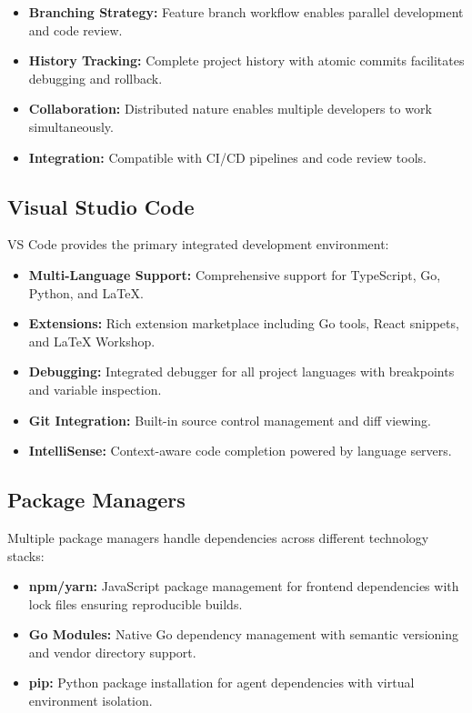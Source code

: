 \begin{itemize}
    \item \textbf{Branching Strategy:} Feature branch workflow enables parallel development and code review.
    \item \textbf{History Tracking:} Complete project history with atomic commits facilitates debugging and rollback.
    \item \textbf{Collaboration:} Distributed nature enables multiple developers to work simultaneously.
    \item \textbf{Integration:} Compatible with CI/CD pipelines and code review tools.
\end{itemize}

\subsection{Visual Studio Code}

VS Code provides the primary integrated development environment:

\begin{itemize}
    \item \textbf{Multi-Language Support:} Comprehensive support for TypeScript, Go, Python, and LaTeX.
    \item \textbf{Extensions:} Rich extension marketplace including Go tools, React snippets, and LaTeX Workshop.
    \item \textbf{Debugging:} Integrated debugger for all project languages with breakpoints and variable inspection.
    \item \textbf{Git Integration:} Built-in source control management and diff viewing.
    \item \textbf{IntelliSense:} Context-aware code completion powered by language servers.
\end{itemize}

\subsection{Package Managers}

Multiple package managers handle dependencies across different technology stacks:

\begin{itemize}
    \item \textbf{npm/yarn:} JavaScript package management for frontend dependencies with lock files ensuring reproducible builds.
    \item \textbf{Go Modules:} Native Go dependency management with semantic versioning and vendor directory support.
    \item \textbf{pip:} Python package installation for agent dependencies with virtual environment isolation.
\end{itemize}

